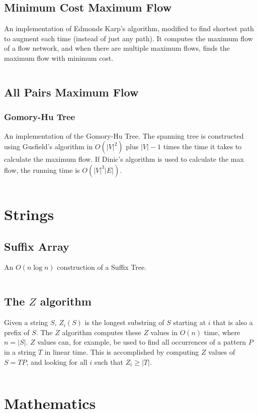 \documentclass[9pt,a4paper]{amsart}
\newcommand{\code}[1]{\inputminted[linenos]{cpp}{_code/#1}}
\begin{document}
    \subsection{Minimum Cost Maximum Flow}
        An implementation of Edmonds Karp's algorithm, modified to find
        shortest path to augment each time (instead of just any path). It
        computes the maximum flow of a flow network, and when there are
        multiple maximum flows, finds the maximum flow with minimum cost.
        \code{graph/edmonds_karps_mcmf.cpp}

    \subsection{All Pairs Maximum Flow}
        \subsubsection{Gomory-Hu Tree}
        An implementation of the Gomory-Hu Tree. The spanning tree is constructed using Gusfield's algorithm
        in $O(|V| ^ 2)$ plus $|V|-1$ times the time it takes to calculate the maximum flow.
        If Dinic's algorithm is used to calculate the max flow, the running time is $O(|V|^3|E|)$.
        \code{graph/gomory_hu_tree.cpp}

\section{Strings}
    \subsection{Suffix Array}
        An $O(n \log n)$ construction of a Suffix Tree.
        \code{strings/suffix_array.cpp}

    \subsection{The $Z$ algorithm}
        Given a string $S$, $Z_i(S)$ is the longest substring of $S$ starting
        at $i$ that is also a prefix of $S$. The $Z$ algorithm computes these
        $Z$ values in $O(n)$ time, where $n = |S|$. $Z$ values can, for
        example, be used to find all occurrences of a pattern $P$ in a string
        $T$ in linear time. This is accomplished by computing $Z$ values of $S
        = T P$, and looking for all $i$ such that $Z_i \geq |T|$.
        \code{strings/z_algorithm.cpp}

\section{Mathematics}
\end{document}
